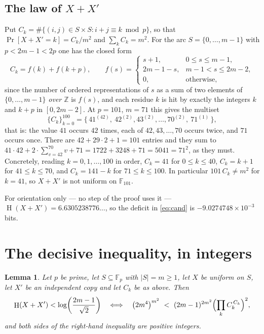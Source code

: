 \documentclass[11pt]{amsart}
\newtheorem{lemma}[theorem]{Lemma}
\theoremstyle{remark}
\DeclareMathOperator{\Ent}{H}
\newcommand{\Fp}{\mathbb F_p}
\begin{document}
\subsection*{The law of $X+X'$}
Put $C_k=\#\{(i,j)\in S\times S: i+j\equiv k \bmod p\}$, so that
$\Pr[X+X'=k]=C_k/m^2$ and $\sum_k C_k=m^2$.  For the arc
$S=\{0,\dots,m-1\}$ with $p<2m-1<2p$ one has the closed form
\begin{equation}\label{eq:closed}
  C_k=f(k)+f(k+p),\qquad
  f(s)=\begin{cases}
   s+1, & 0\le s\le m-1,\\
   2m-1-s, & m-1<s\le 2m-2,\\
   0,&\text{otherwise,}
  \end{cases}
\end{equation}
since the number of ordered representations of $s$ as a sum of two elements of
$\{0,\dots,m-1\}$ \emph{over $\mathbb Z$} is $f(s)$, and each residue $k$ is
hit by exactly the integers $k$ and $k+p$ in $[0,2m-2]$.  At $p=101$, $m=71$
this gives the multiset
\begin{equation}\label{eq:multiset}
  \{C_k\}_{k=0}^{100}
  =\bigl\{\,41^{(42)},\ 42^{(2)},43^{(2)},\dots,70^{(2)},\ 71^{(1)}\,\bigr\},
\end{equation}
that is: the value $41$ occurs $42$ times, each of $42,43,\dots,70$ occurs
twice, and $71$ occurs once.  There are $42+29\cdot2+1=101$ entries and they
sum to $41\cdot42+2\cdot\sum_{v=42}^{70}v+71=1722+3248+71=5041=71^2$, as they
must.  Concretely, reading $k=0,1,\dots,100$ in order,
$C_k=41$ for $0\le k\le 40$, $C_k=k+1$ for $41\le k\le 70$, and
$C_k=141-k$ for $71\le k\le 100$.  In particular $101\,C_k\ne m^2$ for
$k=41$, so $X+X'$ is not uniform on $\mathbb F_{101}$.

For orientation only --- no step of the proof uses it ---
$\Ent(X+X')=6.6305238776\ldots$, so the deficit in \eqref{eq:cand} is
$-9.0274748\times10^{-3}$ bits.

\section{The decisive inequality, in integers}

\begin{lemma}\label{lem:crit}
Let $p$ be prime, let $S\subseteq\Fp$ with $|S|=m\ge1$, let $X$ be uniform on
$S$, let $X'$ be an independent copy and let $C_k$ be as above.  Then
\begin{equation}\label{eq:crit}
  \Ent(X+X')<\log\!\left(\frac{2m-1}{\sqrt2}\right)
  \quad\Longleftrightarrow\quad
  \bigl(2m^4\bigr)^{m^2}
  \ <\ (2m-1)^{2m^2}\Bigl(\prod_{k}C_k^{\,C_k}\Bigr)^{2},
\end{equation}
and both sides of the right-hand inequality are positive integers.
\end{lemma}
\end{document}
